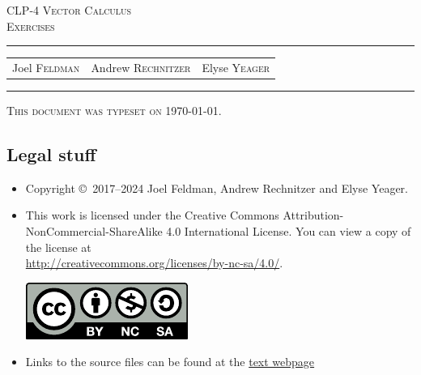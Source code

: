 \documentclass[12pt,letterpaper, openany]{book}
\begin{document}
\setcounter{page}{0}


\begin{titlepage}
\begin{center}
\textsc{\LARGE
CLP-4 Vector Calculus \\[2ex]
Exercises
}\\[2ex]

\vspace{5ex}
\hrule
\vspace{5ex}

\begin{tabular}{ccc}
\large  Joel \textsc{Feldman}
& \large \qquad Andrew \textsc{Rechnitzer}
&\large  \qquad Elyse \textsc{Yeager}
\end{tabular}

\end{center}
\vspace{2ex}
\hrule

\vfill
\textsc{This document was typeset on \today.}
\end{titlepage}

\subsection*{Legal stuff}
\begin{itemize}
 \item Copyright \copyright\ 2017--2024 Joel Feldman, Andrew Rechnitzer and Elyse Yeager.

\item This work is licensed under the
Creative Commons Attribution-NonCommercial-ShareAlike 4.0 International
License. You can view a copy of the license at \\
\url{http://creativecommons.org/licenses/by-nc-sa/4.0/}.
\begin{center}
 \includegraphics{by-nc-sa.pdf}
\end{center}


\item Links to the source files can be found at the \href{http://www.math.ubc.ca/~CLP/index.html}{text webpage}
\end{itemize}

\newpage
\end{document}
